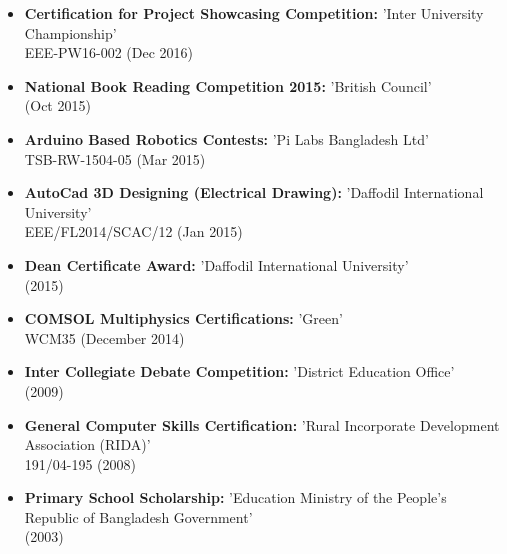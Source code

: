 \documentclass[11pt,a4paper,sans]{moderncv}        %
\begin{document}
\begin{itemize}

\item \textbf{Certification for Project Showcasing Competition:} 'Inter University Championship' \\ EEE-PW16-002 (Dec 2016)

\vspace{6pt}

\item \textbf{National Book Reading Competition 2015:} 'British Council' \\ (Oct 2015)

\vspace{6pt}

\item \textbf{Arduino Based Robotics Contests:} 'Pi Labs Bangladesh Ltd' \\ TSB-RW-1504-05 (Mar 2015)

\vspace{6pt}

\item \textbf{AutoCad 3D Designing (Electrical Drawing):} 'Daffodil International University' \\ EEE/FL2014/SCAC/12 (Jan 2015)

\vspace{6pt}

\item \textbf{Dean Certificate Award:} 'Daffodil International University'\\(2015)

\vspace{6pt}

\item \textbf{COMSOL Multiphysics Certifications:} 'Green'\\ WCM35 (December 2014)

\vspace{6pt}

\item \textbf{Inter Collegiate Debate Competition:} 'District Education Office'\\ (2009)

\vspace{6pt}

\item \textbf{General Computer Skills Certification:} 'Rural Incorporate Development Association (RIDA)'\\191/04-195 (2008)

\vspace{6pt}

\item \textbf{Primary School Scholarship:} 'Education Ministry of the People's Republic of Bangladesh Government'\\(2003)

\end{itemize}
\end{document}
